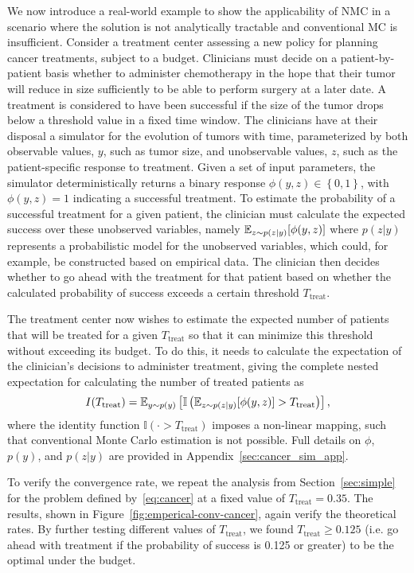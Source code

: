 We now introduce a real-world example to show the applicability of NMC in a scenario
where the solution is not analytically tractable and conventional MC is insufficient.
Consider a treatment center assessing a new policy for planning cancer treatments, subject to a budget. 
Clinicians must decide on a patient-by-patient basis whether to administer chemotherapy in the
hope that their tumor will reduce in size sufficiently to be able to perform surgery at a later date.
A treatment is considered to have been successful if the size of the tumor drops below a threshold value in a fixed time window.
The clinicians have at their disposal a simulator for the evolution of tumors with time,
parameterized by both observable values, $y$, such as tumor size, and unobservable values, $z$, such as the patient-specific response to treatment.
Given a set of input parameters, the simulator deterministically returns a binary response $\phi(y,z)\in\left\lbrace 0,1\right\rbrace $, with $\phi(y,z) = 1$ indicating a successful treatment.
To estimate the probability of a successful treatment for a given patient, the clinician must calculate the expected
success over these unobserved variables, namely $\mathbb{E}_{z\sim p(z|y)} [\phi(y,z)]$ where $p(z|y)$ represents a probabilistic
model for the unobserved variables, which could, for example, be constructed based on empirical data.
The clinician then decides whether to go ahead with the treatment for that
patient based on whether the calculated probability of success exceeds a certain threshold $T_{\mathrm{treat}}$.

The treatment center now wishes to estimate the expected number of patients that will be treated for a given $T_{\mathrm{treat}}$ so that it can minimize this threshold without exceeding its budget.
To do this, it needs to calculate the expectation of the clinician's decisions to administer 
treatment, giving the complete nested expectation for calculating the number of treated patients as
\begin{equation}
	\label{eq:cancer}
I(T_{\mathrm{treat}}) = \mathbb{E}_{y \sim p(y)} \left[\mathbb{I}\left(\mathbb{E}_{z\sim p(z|y)} [\phi(y,z)]>T_{\mathrm{treat}}\right)\right],
\end{equation}
where the identity function $\mathbb{I}(\cdot > T_{\mathrm{treat}})$ imposes a non-linear
mapping, such that conventional Monte Carlo estimation is not possible. Full details on $\phi$, $p(y)$, and $p(z|y)$ are 
provided in Appendix~\ref{sec:cancer_sim_app}.

To verify the convergence rate, we repeat the analysis from Section~\ref{sec:simple} for the problem defined 
by~\eqref{eq:cancer} at a fixed value of $T_{\mathrm{treat}}=0.35$. 
The results, shown in Figure~\ref{fig:emperical-conv-cancer}, again verify the theoretical rates. 
By further testing different values of $T_{\mathrm{treat}}$, we found $T_{\mathrm{treat}} \ge 0.125$ (i.e.
go ahead with treatment if the probability of success is 0.125 or greater) to be the optimal under the budget.

